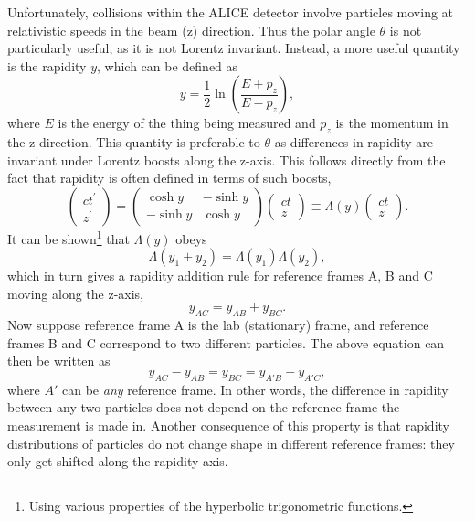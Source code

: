 Unfortunately, collisions within the ALICE detector involve particles moving at relativistic speeds in the beam (z) direction. Thus the polar angle $\theta$ is not particularly useful, as it is not Lorentz invariant. Instead, a more useful quantity is the rapidity $y$, which can be defined as
\begin{equation}
    y = \frac{1}{2} \ln \left( \frac{E + p_{z}}{E - p_{z}} \right),
\end{equation}
where $E$ is the energy of the thing being measured and $p_{z}$ is the momentum in the z-direction. This quantity is preferable to $\theta$ as differences in rapidity are invariant under Lorentz boosts along the z-axis. This follows directly from the fact that rapidity is often defined in terms of such boosts,
\begin{equation}
    \left(\begin{array}{c}
        c t^{\prime} \\
        z^{\prime}
        \end{array}\right)=\left(\begin{array}{cc}
        \cosh y & -\sinh y \\
        -\sinh y & \cosh y
        \end{array}\right)\left(\begin{array}{c}
        c t \\
        z
        \end{array}\right) \equiv \Lambda(y)\left(\begin{array}{c}
        c t \\
        z
        \end{array}\right).
\end{equation}
It can be shown\footnote{Using various properties of the hyperbolic trigonometric functions.} that $\Lambda(y)$ obeys
\begin{equation}
    \Lambda(y_1 + y_2) = \Lambda(y_1)\Lambda(y_2),
\end{equation}
which in turn gives a rapidity addition rule for reference frames A, B and C moving along the z-axis,
\begin{equation}
    y_{AC} = y_{AB} + y_{BC}.
\end{equation}
Now suppose reference frame A is the lab (stationary) frame, and reference frames B and C correspond to two different particles. The above equation can then be written as
\begin{equation}
    y_{AC} - y_{AB} = y_{BC} = y_{A'B} - y_{A'C},
\end{equation}
where $A'$ can be \textit{any} reference frame. In other words, the difference in rapidity between any two particles does not depend on the reference frame the measurement is made in. Another consequence of this property is that rapidity distributions of particles do not change shape in different reference frames: they only get shifted along the rapidity axis.

